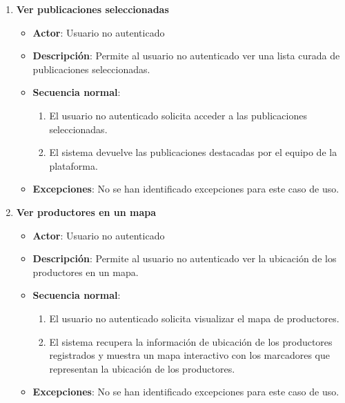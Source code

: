 \begin{enumerate}[label=UC-\protect\twodigits{\arabic*}:, align=left, leftmargin=*]
\item \textbf{Ver publicaciones seleccionadas}
\begin{itemize}
\item \textbf{Actor}: Usuario no autenticado
\item \textbf{Descripción}: Permite al usuario no autenticado ver una lista curada de publicaciones seleccionadas.
\item \textbf{Secuencia normal}:
\begin{enumerate}[label={\arabic*}:]
\item El usuario no autenticado solicita acceder a las publicaciones seleccionadas.
\item El sistema devuelve las publicaciones destacadas por el equipo de la plataforma.
\end{enumerate}
\item \textbf{Excepciones}: No se han identificado excepciones para este caso de uso.
\end{itemize}

\item \textbf{Ver productores en un mapa}
\begin{itemize}
\item \textbf{Actor}: Usuario no autenticado
\item \textbf{Descripción}: Permite al usuario no autenticado ver la ubicación de los productores en un mapa.
\item \textbf{Secuencia normal}:
\begin{enumerate}[label={\arabic*}:]
\item El usuario no autenticado solicita visualizar el mapa de productores.
\item El sistema recupera la información de ubicación de los productores registrados y muestra un mapa interactivo con los marcadores que representan la ubicación de los productores.
\end{enumerate}
\item \textbf{Excepciones}: No se han identificado excepciones para este caso de uso.
\end{itemize}


\end{enumerate}
